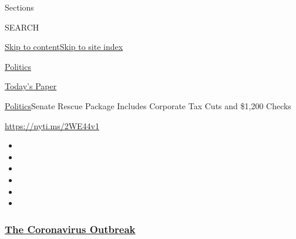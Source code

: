 Sections

SEARCH

\protect\hyperlink{site-content}{Skip to
content}\protect\hyperlink{site-index}{Skip to site index}

\href{https://www.nytimes3xbfgragh.onion/section/politics}{Politics}

\href{https://myaccount.nytimes3xbfgragh.onion/auth/login?response_type=cookie\&client_id=vi}{}

\href{https://www.nytimes3xbfgragh.onion/section/todayspaper}{Today's
Paper}

\href{/section/politics}{Politics}\textbar{}Senate Rescue Package
Includes Corporate Tax Cuts and \$1,200 Checks

\url{https://nyti.ms/2WE44v1}

\begin{itemize}
\item
\item
\item
\item
\item
\item
\end{itemize}

\hypertarget{the-coronavirus-outbreak}{%
\subsubsection{\texorpdfstring{\href{https://www.nytimes3xbfgragh.onion/news-event/coronavirus?name=styln-coronavirus-national\&region=TOP_BANNER\&block=storyline_menu_recirc\&action=click\&pgtype=Article\&impression_id=2ff65570-f280-11ea-bf3d-b99d4e75db11\&variant=undefined}{The
Coronavirus
Outbreak}}{The Coronavirus Outbreak}}\label{the-coronavirus-outbreak}}


